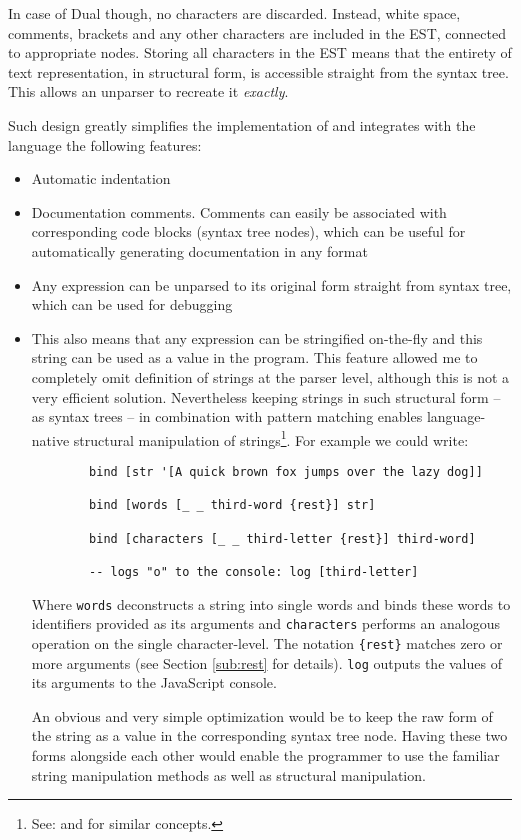 In case of Dual though, no characters are discarded. Instead, white space, comments, brackets and any other characters are included in the EST, connected to appropriate nodes. Storing all characters in the EST means that the entirety of text representation, in structural form, is accessible straight from the syntax tree. This allows an unparser to recreate it \textit{exactly}.

Such design greatly simplifies the implementation of and integrates with
the language the following features:
\begin{itemize}
    \item Automatic indentation
    \item Documentation comments. Comments can easily be associated with
      corresponding code blocks (syntax tree nodes), which can be useful for
      automatically generating documentation in any format
    \item Any expression can be unparsed to its original form straight from
      syntax tree, which can be used for debugging
    \item This also means that any expression can be stringified on-the-fly and
      this string can be used as a value in the program. This feature allowed me
      to completely omit definition of strings at the parser level, although
      this is not a very efficient solution. Nevertheless keeping strings in
      such structural form -- as syntax trees -- in combination with pattern
      matching enables language-native structural manipulation of
      strings\footnote{See:
        \cite{wolfram_string_patterns}
        and
        \cite[Section~Pattern matching and strings]{pattern_matching_wikipedia}
        for similar concepts.}. For example
      we could write:
    \begin{lstlisting}
        bind [str '[A quick brown fox jumps over the lazy dog]]
                    
        bind [words [_ _ third-word {rest}] str]
        
        bind [characters [_ _ third-letter {rest}] third-word]
        
        -- logs "o" to the console: log [third-letter]
    \end{lstlisting}
    
Where \texttt{words} deconstructs a string into single words and binds these
words to identifiers provided as its arguments and \texttt{characters} performs
an analogous operation on the single character-level. The notation
\texttt{\{rest\}} matches zero or more arguments (see Section \ref{sub:rest} for
details). \texttt{log} outputs the values of its arguments to the JavaScript
console.

 An obvious and very simple optimization
would be to keep the raw form of the string as a value in the
corresponding syntax tree node. Having these two forms alongside each
other would enable the programmer to use the familiar string
manipulation methods as well as structural manipulation.
\end{itemize}

